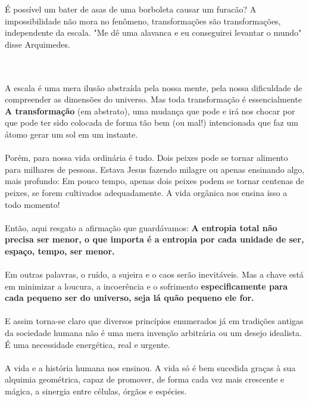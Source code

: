 \documentclass[11pt]{article}
\begin{document}
É possível um bater de asas de uma borboleta causar um furacão? A impossibilidade não mora no fenômeno, transformações são transformações, independente da escala. "Me dê uma alavanca e eu conseguirei levantar o mundo" disse Arquimedes.\\\\\

A escala é uma mera ilusão abstraída pela nossa mente, pela nossa dificuldade de compreender as dimensões do universo. Mas toda transformação é essencialmente \textbf{A transformação} (em abstrato), uma mudança que pode e irá nos chocar por que pode ter sido colocada de forma tão bem (ou mal!) intencionada que faz um átomo gerar um sol em um instante. \\\\

Porém, para nossa vida ordinária é tudo. Dois peixes pode se tornar alimento para milhares de pessoas. Estava Jesus fazendo milagre ou apenas ensinando algo, mais profundo: Em pouco tempo, apenas dois peixes podem se tornar centenas de peixes, se forem cultivados adequadamente. A vida orgânica nos ensina isso a todo momento!\\\\

Então, aqui resgato a afirmação que guardávamos: \textbf{A entropia total não precisa ser menor, o que importa é a entropia por cada unidade de ser, espaço, tempo, ser menor.}\\\\

Em outras palavras, o ruído, a sujeira e o caos serão inevitáveis. Mas a chave está em minimizar a loucura, a incoerência e o sofrimento \textbf{especificamente para cada pequeno ser do universo, seja lá quão pequeno ele for.}\\\\

E assim torna-se claro que diversos princípios enumerados já em tradições antigas da sociedade humana não é uma mera invenção arbitrária ou um desejo idealista. É uma necessidade energética, real e urgente.\\\\

A vida e a história humana nos ensinou. A vida só é bem sucedida graças à sua alquimia geométrica, capaz de promover, de forma cada vez mais crescente e mágica, a sinergia entre células, órgãos e espécies.\\\\
\end{document}

